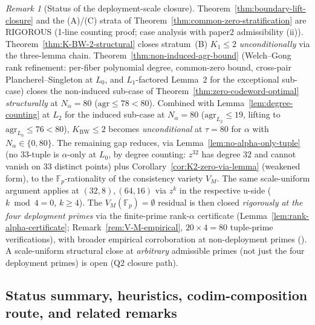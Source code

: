 \documentclass[11pt]{article}
\theoremstyle{definition}
\theoremstyle{remark}
\newtheorem{remark}[theorem]{Remark}
\begin{document}
\begin{remark}[Status of the deployment-scale closure]
\label{rem:deployment-local-closure-status}
Theorem~\ref{thm:boundary-lift-closure} and the (A)/(C) strata of
Theorem~\ref{thm:common-zero-stratification} are RIGOROUS (1-line counting
proof; case analysis with paper2 admissibility (ii)).
Theorem~\ref{thm:K-BW-2-structural} closes stratum~(B) $K_1 \leq 2$
\emph{unconditionally} via the three-lemma chain.
Theorem~\ref{thm:non-induced-agr-bound} (Welch--Gong rank
refinement: per-fiber polynomial degree, common-zero bound, cross-pair
Plancherel--Singleton at $L_0$, and $L_1$-factored Lemma~$2$ for the
exceptional sub-case) closes the non-induced sub-case of
Theorem~\ref{thm:zero-codeword-optimal}
\emph{structurally} at $N_\alpha = 80$ ($\mathrm{agr} \leq 78 < 80$).
Combined with Lemma~\ref{lem:degree-counting} at $L_2$ for the induced sub-case at
$N_\alpha = 80$ ($\mathrm{agr}_{L_2} \leq 19$, lifting to
$\mathrm{agr}_{L_0} \leq 76 < 80$), $K_{\mathrm{BW}} \leq 2$ becomes
\emph{unconditional} at $\tau = 80$ for $\alpha$ with
$N_\alpha \in \{0, 80\}$. The remaining gap reduces, via
Lemma~\ref{lem:no-alpha-only-tuple} (no $33$-tuple is $\alpha$-only at
$L_0$, by degree counting: $z^{32}$ has degree $32$ and cannot vanish
on $33$ distinct points) plus Corollary~\ref{cor:K2-zero-via-lemma}
(weakened form), to the $\mathbb{F}_p$-rationality of the consistency
variety $V_M$. The same scale-uniform argument applies at $(32, 8),
(64, 16)$ via $z^k$ in the respective u-side ($k \bmod 4 = 0$,
$k \geq 4$). The $V_M(\mathbb{F}_p) = \emptyset$ residual is then
closed \emph{rigorously at the four deployment primes} via the
finite-prime rank-$\alpha$ certificate (Lemma~\ref{lem:rank-alpha-certificate};
Remark~\ref{rem:V-M-empirical}, $20 \times 4 = 80$ tuple-prime
verifications), with broader empirical corroboration at non-deployment
primes (\cite{CompanionRepo}). A scale-uniform structural close at
\emph{arbitrary} admissible primes (not just the four deployment
primes) is open (Q2 closure path).
\end{remark}


\subsection{Status summary, heuristics, codim-composition route, and related remarks}
\label{app:layer3-status}
\end{document}
